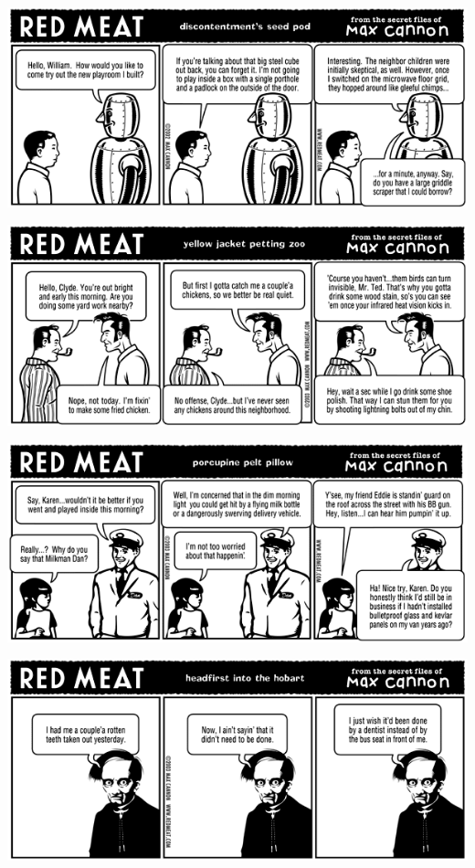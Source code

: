 \documentclass[a4paper,twoside,11pt]{article}
\begin{document}
\includegraphics[width=\textwidth]{redmeat_2003-01-21.png}



\includegraphics[width=\textwidth]{redmeat_2003-01-28.png}



\includegraphics[width=\textwidth]{redmeat_2003-02-04.png}



\includegraphics[width=\textwidth]{redmeat_2003-02-11.png}
\end{document}
